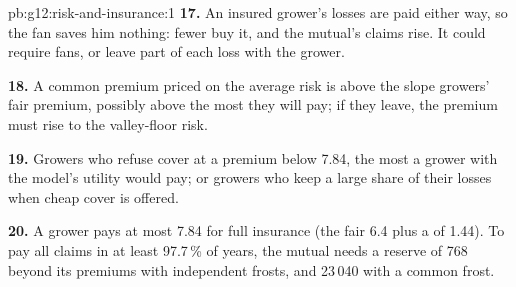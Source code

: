 \begin{solution}{pb:g12:risk-and-insurance:1}
\textbf{17.} An insured grower's losses are paid either way, so the fan saves him nothing: fewer buy it, and the mutual's claims rise. It could require fans, or leave part
of each loss with the grower.

\textbf{18.} A common premium priced on the average risk is above the slope growers' fair premium, possibly above the most they will pay; if they leave, the premium must
rise to the valley-floor risk.

\textbf{19.} Growers who refuse cover at a premium below 7.84, the most a grower with the model's utility would pay; or growers who keep a large share of their losses when
cheap cover is offered.

\textbf{20.} A grower pays at most 7.84 for full insurance (the fair 6.4 plus a  of 1.44). To pay all claims in at least 97.7\,\% of years, the mutual needs a
reserve of 768 beyond its premiums with independent frosts, and 23\,040 with a common frost.
\end{solution}

